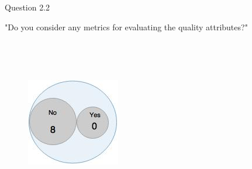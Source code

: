\begin{shaded} Question 2.2 \end{shaded} \label{question:hybris_architecture/interview/question_2.2}
"Do you consider any metrics for evaluating the quality attributes?"\\

\\

\\
\begin{figure}[H]
\begin{center}
\includegraphics[scale=0.5]{figures/question2_2}
\label{fig:hybris_architecture/interview/question2-2}
\end{center}
\end{figure}
